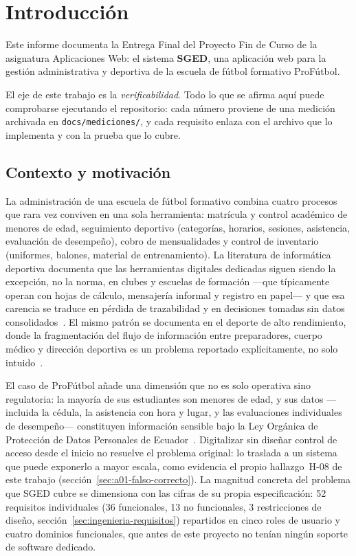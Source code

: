 \documentclass[11pt,a4paper]{article}
\newcommand{\ruta}[1]{\texttt{\footnotesize #1}}
\begin{document}
\section{Introducción}

Este informe documenta la Entrega Final del Proyecto Fin de Curso de la
asignatura Aplicaciones Web: el sistema \textbf{SGED}, una aplicación web
para la gestión administrativa y deportiva de la escuela de fútbol formativo
ProFútbol.

El eje de este trabajo es la \emph{verificabilidad}. Todo lo que se afirma
aquí puede comprobarse ejecutando el repositorio: cada número proviene de una
medición archivada en \ruta{docs/mediciones/}, y cada requisito enlaza con el
archivo que lo implementa y con la prueba que lo cubre.

\subsection{Contexto y motivación}
\label{sec:contexto-motivacion}

La administración de una escuela de fútbol formativo combina cuatro
procesos que rara vez conviven en una sola herramienta: matrícula y
control académico de menores de edad, seguimiento deportivo (categorías,
horarios, sesiones, asistencia, evaluación de desempeño), cobro de
mensualidades y control de inventario (uniformes, balones, material de
entrenamiento). La literatura de informática deportiva documenta que las
herramientas digitales dedicadas siguen siendo la excepción, no la norma,
en clubes y escuelas de formación —que típicamente operan con hojas de
cálculo, mensajería informal y registro en papel— y que esa carencia se
traduce en pérdida de trazabilidad y en decisiones tomadas sin datos
consolidados~\cite{blobel2020cis}. El mismo patrón se documenta en el
deporte de alto rendimiento, donde la fragmentación del flujo de
información entre preparadores, cuerpo médico y dirección deportiva es
un problema reportado explícitamente, no solo intuido~\cite{ranaweera2022rugby}.

El caso de ProFútbol añade una dimensión que no es solo operativa sino
regulatoria: la mayoría de sus estudiantes son menores de edad, y sus
datos —incluida la cédula, la asistencia con hora y lugar, y las
evaluaciones individuales de desempeño— constituyen información sensible
bajo la Ley Orgánica de Protección de Datos Personales de
Ecuador~\cite{lopdp2021}. Digitalizar sin diseñar control de acceso desde
el inicio no resuelve el problema original: lo traslada a un sistema que
puede exponerlo a mayor escala, como evidencia el propio hallazgo~H-08 de
este trabajo (sección~\ref{sec:a01-falso-correcto}). La magnitud concreta
del problema que SGED cubre se dimensiona con las cifras de su propia
especificación: 52 requisitos individuales (36 funcionales, 13 no
funcionales, 3 restricciones de diseño, sección~\ref{sec:ingenieria-requisitos})
repartidos en cinco roles de usuario y cuatro dominios funcionales, que
antes de este proyecto no tenían ningún soporte de software dedicado.
\end{document}
